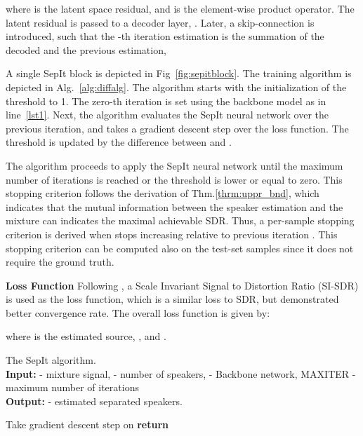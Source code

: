 \documentclass[a4paper]{article}
\theoremstyle{plain}
\theoremstyle{definition}
\theoremstyle{remark}
\begin{document}
where  is the latent space residual, and  is the element-wise product operator.
The latent residual  is passed to a decoder layer, . Later, a skip-connection is introduced, such that the -th iteration estimation is the summation of the decoded  and the previous estimation,

A single SepIt block is depicted in Fig~\ref{fig:sepitblock}.
The training algorithm is depicted in Alg.~\ref{alg:diffalg}. The algorithm starts with the initialization of the threshold  to 1. The zero-th iteration is set using the backbone model as in line~\ref{lst1}. Next, the algorithm evaluates the SepIt neural network over the previous iteration, and takes a gradient descent step over the loss function. The threshold  is updated by the difference between  and . 

The algorithm proceeds to apply the SepIt neural network until the maximum number of iterations is reached or the threshold is lower or equal to zero. This stopping criterion follows the derivation of Thm.\ref{thrm:uppr_bnd}, which indicates that the mutual information between the speaker estimation  and the mixture  can indicates the maximal achievable SDR. Thus, a per-sample stopping criterion is derived when  stops increasing relative to previous iteration . This stopping criterion can be computed also on the test-set samples since it does not require the ground truth.

\textbf{Loss Function} Following \cite{roux2018sdr}, a Scale Invariant Signal to Distortion Ratio (SI-SDR) is used as the loss function, which is a similar loss to SDR, but demonstrated better convergence rate. The overall loss function is given by:

where  is the estimated source, , and .


\begin{algorithm}[h]
\caption{The SepIt algorithm. \\ \textbf{Input:}  - mixture signal,  - number of speakers,  - Backbone network, MAXITER - maximum number of iterations \\
\textbf{Output:}  - estimated separated speakers.}
\label{alg:diffalg}
\begin{algorithmic}[1]
\STATE   
\STATE  
\STATE  \label{lst1}
\STATE 
{} \label{lst:line:blah2}
\STATE  
\STATE  \STATE Take gradient descent step on 
\STATE 
\STATE 
\ENDWHILE\label{diffsepdwhile}
\STATE \textbf{return} 
\end{algorithmic}
\end{algorithm}
\end{document}
